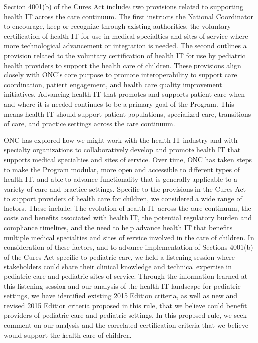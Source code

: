 \documentclass[twoside,11pt]{article}
\begin{document}
          Section 4001(b) of the Cures Act includes two provisions related to supporting health IT across the care continuum. The first instructs the National Coordinator to encourage, keep or recognize through existing authorities, the voluntary certification of health IT for use in medical specialties and sites of service where more technological advancement or integration is needed. The second outlines a provision related to the voluntary certification of health IT for use by pediatric health providers to support the health care of children. These provisions align closely with ONC's core purpose to promote interoperability to support care coordination, patient engagement, and health care quality improvement initiatives. Advancing health IT that promotes and supports patient care when and where it is needed continues to be a primary goal of the Program. This means health IT should support patient populations, specialized care, transitions of care, and practice settings across the care continuum.


          ONC has explored how we might work with the health IT industry and with specialty organizations to collaboratively develop and promote health IT that supports medical specialties and sites of service. Over time, ONC has taken steps to make the Program modular, more open and accessible to different types of health IT, and able to advance functionality that is generally applicable to a variety of care and practice settings. Specific to the provisions in the Cures Act to support providers of health care for children, we considered a wide range of factors. These include: The evolution of health IT across the care continuum, the costs and benefits associated with health IT, the potential regulatory burden and compliance timelines, and the need to help advance health IT that benefits multiple medical specialties and sites of service involved in the care of children. In consideration of these factors, and to advance implementation of Sections 4001(b) of the Cures Act specific to pediatric care, we held a listening session where stakeholders could share their clinical knowledge and technical expertise in pediatric care and pediatric sites of service. Through the information learned at this listening session and our analysis of the health IT landscape for pediatric settings, we have identified existing 2015 Edition criteria, as well as new and revised 2015 Edition criteria proposed in this rule, that we believe could benefit providers of pediatric care and pediatric settings. In this proposed rule, we seek comment on our analysis and the correlated certification criteria that we believe would support the health care of children.
\end{document}
